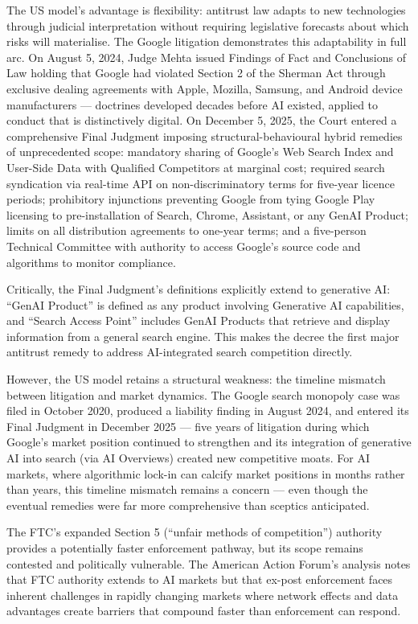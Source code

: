 The US model's advantage is flexibility: antitrust law adapts to new technologies through judicial interpretation without requiring legislative forecasts about which risks will materialise. The Google litigation demonstrates this adaptability in full arc. On August 5, 2024, Judge Mehta issued Findings of Fact and Conclusions of Law holding that Google had violated Section 2 of the Sherman Act through exclusive dealing agreements with Apple, Mozilla, Samsung, and Android device manufacturers --- doctrines developed decades before AI existed, applied to conduct that is distinctively digital. On December 5, 2025, the Court entered a comprehensive Final Judgment imposing structural-behavioural hybrid remedies of unprecedented scope: mandatory sharing of Google's Web Search Index and User-Side Data with Qualified Competitors at marginal cost; required search syndication via real-time API on non-discriminatory terms for five-year licence periods; prohibitory injunctions preventing Google from tying Google Play licensing to pre-installation of Search, Chrome, Assistant, or any GenAI Product; limits on all distribution agreements to one-year terms; and a five-person Technical Committee with authority to access Google's source code and algorithms to monitor compliance.

Critically, the Final Judgment's definitions explicitly extend to generative AI: ``GenAI Product'' is defined as any product involving Generative AI capabilities, and ``Search Access Point'' includes GenAI Products that retrieve and display information from a general search engine. This makes the  decree the first major antitrust remedy to address AI-integrated search competition directly.

However, the US model retains a structural weakness: the timeline mismatch between litigation and market dynamics. The Google search monopoly case was filed in October 2020, produced a liability finding in August 2024, and entered its Final Judgment in December 2025 --- five years of litigation during which Google's market position continued to strengthen and its integration of generative AI into search (via AI Overviews) created new competitive moats. For AI markets, where algorithmic lock-in can calcify market positions in months rather than years, this timeline mismatch remains a concern --- even though the eventual remedies were far more comprehensive than sceptics anticipated.

The FTC's expanded Section 5 (``unfair methods of competition'') authority provides a potentially faster enforcement pathway, but its scope remains contested and politically vulnerable. The American Action Forum's analysis notes that FTC authority extends to AI markets but that ex-post enforcement faces inherent challenges in rapidly changing markets where network effects and data advantages create barriers that compound faster than enforcement can respond.

